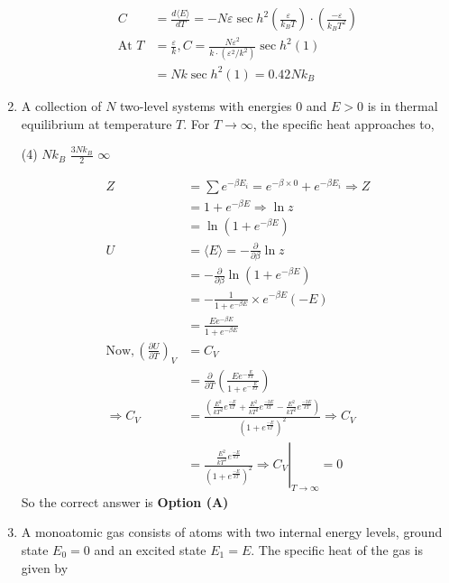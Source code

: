 \begin{enumerate}
\begin{answer}
\begin{align*}
C&=\frac{d\langle E\rangle}{d T}=-N \varepsilon \sec h^{2}\left(\frac{\varepsilon}{k_{B} T}\right) \cdot\left(\frac{-\varepsilon}{k_{B} T^{2}}\right)\\
\text{At }T&=\frac{\varepsilon}{k}, C=\frac{N \varepsilon^{2}}{k \cdot\left(\varepsilon^{2} / k^{2}\right)} \sec h^{2}(1)\\&=N k \sec h^{2}(1)=0.42 N k_{B}
\end{align*}
\end{answer}	
\item A collection of $N$ two-level systems with energies 0 and $E>0$ is in thermal
equilibrium at temperature $T$. For $T \rightarrow \infty$, the specific heat approaches to,
{}
\begin{tasks}(4)
\task[\textbf{B.}] $N k_{B}$
\task[\textbf{C.}] $\frac{3 N k_{B}}{2}$
\task[\textbf{D.}] $\infty$
\end{tasks}
\begin{answer}
\begin{align*}
Z&=\sum e^{-\beta E_{i}}=e^{-\beta \times 0}+e^{-\beta E_{i}} \Rightarrow Z\\&=1+e^{-\beta E} \Rightarrow \ln z\\&=\ln \left(1+e^{-\beta E}\right)\\
U&=\langle E\rangle=-\frac{\partial}{\partial \beta} \ln z\\&=-\frac{\partial}{\partial \beta} \ln \left(1+e^{-\beta E}\right)\\&=-\frac{1}{1+e^{-\beta E}} \times e^{-\beta E}(-E)\\&=\frac{E e^{-\beta E}}{1+e^{-\beta E}}\\
\text{Now},\left(\frac{\partial U}{\partial T}\right)_{V}&=C_{V}\\
&=\frac{\partial}{\partial T}\left(\frac{E e^{-\frac{E}{k T}}}{1+e^{-\frac{E}{k T}}}\right)\\
\Rightarrow C_{V}&=\frac{\left(\frac{E^{2}}{k T^{2}} e^{\frac{-E}{k T}}+\frac{E^{2}}{k T^{2}} e^{\frac{-2 E}{k T}}-\frac{E^{2}}{k T^{2}} e^{\frac{-2 E}{k T}}\right)}{\left(1+e^{\frac{-E}{k T}}\right)^{2}} \Rightarrow C_{V}\\
&=\left.\frac{\frac{E^{2}}{k T^{2}} e^{\frac{-E}{k T}}}{\left(1+e^{\frac{-E}{k T}}\right)^{2}} \Rightarrow C_{V}\right|_{T \rightarrow \infty}=0
\end{align*}
So the correct answer is \textbf{Option (A)}
\end{answer}	
\item  A monoatomic gas consists of atoms with two internal energy levels, ground state $E_{0}=0$ and an excited state $E_{1}=E$. The specific heat of the gas is given by

\end{enumerate}
